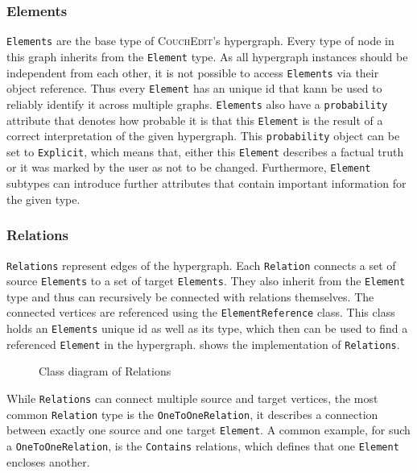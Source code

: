 \subsubsection{Elements}
\texttt{Elements} are the base type of \textsc{CouchEdit}'s hypergraph. Every type of node in this graph inherits from the \texttt{Element} type. As all hypergraph instances should be independent from each other, it is not possible to access \texttt{Elements} via their object reference. Thus every \texttt{Element} has an unique id that kann be used to reliably identify it across multiple graphs. \texttt{Elements} also have a \texttt{probability} attribute that denotes how probable it is that this \texttt{Element} is the result of a correct interpretation of the given hypergraph. This \texttt{probability} object can be set to \texttt{Explicit}, which means that, either this \texttt{Element} describes a factual truth or it was marked by the user as not to be changed. Furthermore, \texttt{Element} subtypes can introduce further attributes that contain important information for the given type.

\subsubsection{Relations}
\texttt{Relations} represent edges of the hypergraph. Each \texttt{Relation} connects a set of source \texttt{Elements} to a set of target \texttt{Elements}. They also inherit from the \texttt{Element} type and thus can recursively be connected with relations themselves. The connected vertices are referenced using the \texttt{ElementReference} class. This class holds an \texttt{Elements} unique id as well as its type, which then can be used to find a referenced \texttt{Element} in the hypergraph.  shows the implementation of \texttt{Relations}. 

\begin{figure}[ht]
  \centering
  
  \caption{Class diagram of Relations}
  \label{fig:relations}
\end{figure}

 While \texttt{Relations} can connect multiple source and target vertices, the most common \texttt{Relation} type is the \texttt{OneToOneRelation}, it describes a connection between exactly one source and one target \texttt{Element}. A common example, for such a \texttt{OneToOneRelation}, is the \texttt{Contains} relations, which defines that one \texttt{Element} encloses another.  


